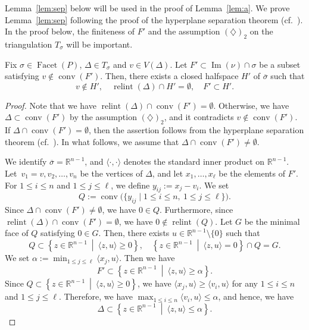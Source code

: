 Lemma~\ref{lem:sep} below will be used in the proof of Lemma~\ref{lem:a}. 
We prove Lemma~\ref{lem:sep} following the proof of the hyperplane separation theorem (cf.\ \cite[Theorem 1.17]{HW}). 
In the proof below, the finiteness of $F'$ and the assumption $(\diamondsuit) _2$ on 
the triangulation $T_{\sigma}$ will be important. 
\begin{lem}\label{lem:sep}
Fix $\sigma \in \operatorname{Facet}(P)$, $\Delta \in T_{\sigma}$ and $v \in V(\Delta)$. 
Let $F' \subset \operatorname{Im}(\nu) \cap \sigma$ be a subset satisfying $v \not \in \operatorname{conv} (F')$. 
Then, there exists a closed halfspace $H'$ of $\overline{\sigma}$ such that 
\[
v \not \in H', \quad \operatorname{relint}(\Delta) \cap H' = \emptyset, \quad F' \subset H'. 
\]
\end{lem}
\begin{proof}
Note that we have $\operatorname{relint}(\Delta) \cap \operatorname{conv} (F') = \emptyset$. 
Otherwise, we have $\Delta \subset \operatorname{conv} (F')$ by the assumption $(\diamondsuit)_2$, 
and it contradicts $v \not \in \operatorname{conv} (F')$. 
If $\Delta \cap \operatorname{conv} (F') = \emptyset$, then the assertion follows from 
the hyperplane separation theorem (cf.\ \cite[Theorem 1.17]{HW}). 
In what follows, we assume that $\Delta \cap \operatorname{conv} (F') \not = \emptyset$. 

We identify $\overline{\sigma} = \mathbb{R}^{n-1}$, 
and $\langle \cdot , \cdot \rangle$ denotes the standard inner product on $\mathbb{R}^{n-1}$. 
Let~$v_1 = v, v_2, \ldots, v_n$ be the vertices of $\Delta$, and 
let $x_1, \ldots , x_{\ell}$ be the elements of $F'$. 
For $1 \le i \le n$ and $1 \le j \le \ell$, we define $y_{ij} := x_j - v_i$. 
We set 
\[
Q := \operatorname{conv}\bigl( \{ y_{ij} \mid 1 \le i \le n, \ 1 \le j \le \ell \} \bigr). 
\]
Since $\Delta \cap \operatorname{conv} (F') \not = \emptyset$, we have $0 \in Q$. 
Furthermore, since $\operatorname{relint}(\Delta) \cap \operatorname{conv} (F') = \emptyset$, 
we have $0 \not \in \operatorname{relint}(Q)$. 
Let $G$ be the minimal face of $Q$ satisfying $0 \in G$. 
Then, there exists $u \in \mathbb{R}^{n-1} \setminus \{ 0 \}$ such that 
\[
Q \subset \left\{ z \in \mathbb{R}^{n-1} \ \middle | \  \langle z, u \rangle \ge 0 \right \}, \quad 
\left\{ z \in \mathbb{R}^{n-1} \ \middle | \  \langle z, u \rangle = 0 \right \} \cap Q = G. 
\]
We set $\alpha := \min _{1 \le j \le \ell} \langle x_j, u \rangle$. 
Then we have
\[\tag{1}
F' \subset \left\{ z \in \mathbb{R}^{n-1} \ \middle | \  \langle z, u \rangle \ge \alpha \right \}. 
\]
Since $Q \subset \left\{ z \in \mathbb{R}^{n-1} \ \middle | \  \langle z, u \rangle \ge 0 \right \}$, 
we have $\langle x_j, u \rangle \ge \langle v_i, u \rangle$ for any $1 \le i \le n$ and $1 \le j \le \ell$. 
Therefore, we have $\max _{1 \le i \le n} \langle v_i, u \rangle \le \alpha$, and hence, we have
\[\tag{2}
\Delta \subset \left\{ z \in \mathbb{R}^{n-1} \ \middle | \  \langle z, u \rangle \le \alpha \right \}.
\]


\end{proof}

